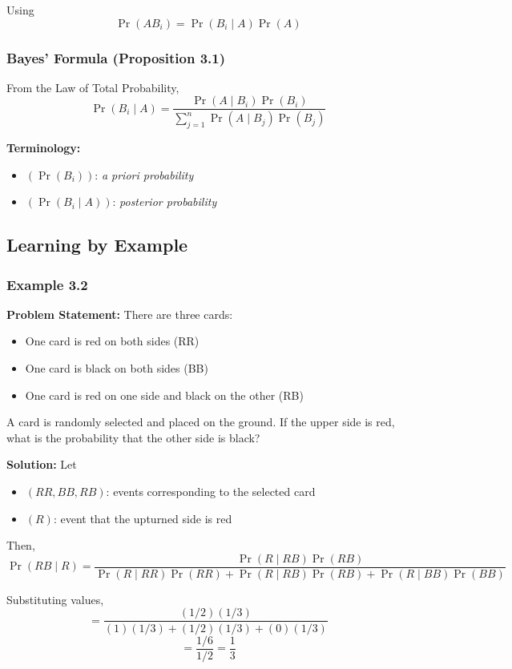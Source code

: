 \documentclass[12pt]{article}
\begin{document}
Using
\[
\Pr(AB_i) = \Pr(B_i \mid A)\Pr(A)
\]

\subsubsection{Bayes’ Formula (Proposition 3.1)}

From the Law of Total Probability,
\[
\Pr(B_i \mid A) = \frac{\Pr(A \mid B_i)\Pr(B_i)}{\sum_{j=1}^{n} \Pr(A \mid B_j)\Pr(B_j)}
\]

\textbf{Terminology:}
\begin{itemize}
    \item $( \Pr(B_i) )$: \textit{a priori probability}
    \item $( \Pr(B_i \mid A) )$: \textit{posterior probability}
\end{itemize}

\subsection{Learning by Example}

\subsubsection{Example 3.2}

\textbf{Problem Statement:}  
There are three cards:
\begin{itemize}
    \item One card is red on both sides (RR)
    \item One card is black on both sides (BB)
    \item One card is red on one side and black on the other (RB)
\end{itemize}

A card is randomly selected and placed on the ground. If the upper side is red, what is the probability that the other side is black?

\textbf{Solution:}  
Let
\begin{itemize}
    \item $( RR, BB, RB )$: events corresponding to the selected card
    \item $( R )$: event that the upturned side is red
\end{itemize}

Then,
\[
\Pr(RB \mid R) = \frac{\Pr(R \mid RB)\Pr(RB)}{\Pr(R \mid RR)\Pr(RR) + \Pr(R \mid RB)\Pr(RB) + \Pr(R \mid BB)\Pr(BB)}
\]

Substituting values,
\[
= \frac{(1/2)(1/3)}{(1)(1/3) + (1/2)(1/3) + (0)(1/3)}
\]
\[
= \frac{1/6}{1/2} = \frac{1}{3}
\]
\end{document}
